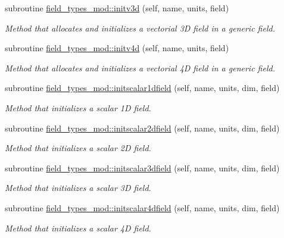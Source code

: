 \begin{DoxyCompactItemize}
subroutine \mbox{\hyperlink{namespacefield__types__mod_ae163912444021fda00f4d821d4c85721}{field\+\_\+types\+\_\+mod\+::initv3d}} (self, name, units, field)
\begin{DoxyCompactList}\small\item\em Method that allocates and initializes a vectorial 3D field in a generic field. \end{DoxyCompactList}\item 
subroutine \mbox{\hyperlink{namespacefield__types__mod_a6a387f83b9c3e63a795e3bccfff5573b}{field\+\_\+types\+\_\+mod\+::initv4d}} (self, name, units, field)
\begin{DoxyCompactList}\small\item\em Method that allocates and initializes a vectorial 4D field in a generic field. \end{DoxyCompactList}\item 
subroutine \mbox{\hyperlink{namespacefield__types__mod_a40667ebd7c9f62482c267e794a14eff4}{field\+\_\+types\+\_\+mod\+::initscalar1dfield}} (self, name, units, dim, field)
\begin{DoxyCompactList}\small\item\em Method that initializes a scalar 1D field. \end{DoxyCompactList}\item 
subroutine \mbox{\hyperlink{namespacefield__types__mod_af0bade94ad526899be6a55a81a407231}{field\+\_\+types\+\_\+mod\+::initscalar2dfield}} (self, name, units, dim, field)
\begin{DoxyCompactList}\small\item\em Method that initializes a scalar 2D field. \end{DoxyCompactList}\item 
subroutine \mbox{\hyperlink{namespacefield__types__mod_af27a754aea73132de47e0a1b7168ca2e}{field\+\_\+types\+\_\+mod\+::initscalar3dfield}} (self, name, units, dim, field)
\begin{DoxyCompactList}\small\item\em Method that initializes a scalar 3D field. \end{DoxyCompactList}\item 
subroutine \mbox{\hyperlink{namespacefield__types__mod_a52e2310f95a85bf65d4a85427814a5ad}{field\+\_\+types\+\_\+mod\+::initscalar4dfield}} (self, name, units, dim, field)
\begin{DoxyCompactList}\small\item\em Method that initializes a scalar 4D field. \end{DoxyCompactList}\item 

\end{DoxyCompactItemize}
